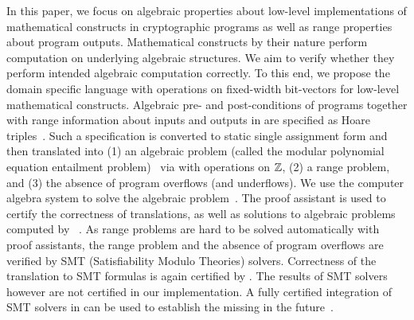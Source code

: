 In this paper, we focus on algebraic properties about low-level
implementations of mathematical constructs in cryptographic programs
as well as range properties about program outputs.
Mathematical constructs by their nature perform computation on
underlying algebraic structures. We aim to verify whether they perform
intended algebraic computation correctly. To this end, we propose the
domain specific language \bvdsl with operations on fixed-width bit-vectors for low-level
mathematical constructs. Algebraic pre- and post-conditions of
programs together with range information about inputs and outputs in \bvdsl are specified as Hoare
triples~\cite{H:69:ABCP}.
Such a specification is converted to static single
assignment form and then translated into (1) an algebraic problem (called
the modular polynomial equation entailment
problem)~\cite{AWZ:88:DQVP,H:07:AENTP} via \zdsl with operations on $\mathbb{Z}$, (2) a range problem, and (3) the absence of program overflows (and underflows). We use the computer
algebra system \singular to solve the algebraic problem~\cite{GP:08:SICA}.
The proof assistant \coq is used to certify the
correctness of translations, as well as solutions to algebraic
problems computed by \singular~\cite{YC:2004:ITPPDC}.
As range problems are hard to be solved automatically with proof assistants, the range problem and the absence of program overflows are verified by SMT (Satisfiability Modulo Theories) solvers.
Correctness of the translation to SMT formulas is again certified by
\coq. The results of SMT solvers however are not certified in our
implementation. A fully certified integration of SMT solvers in \coq
can be used to establish the missing in the future~\cite{EMT+:17:SPISS}.


